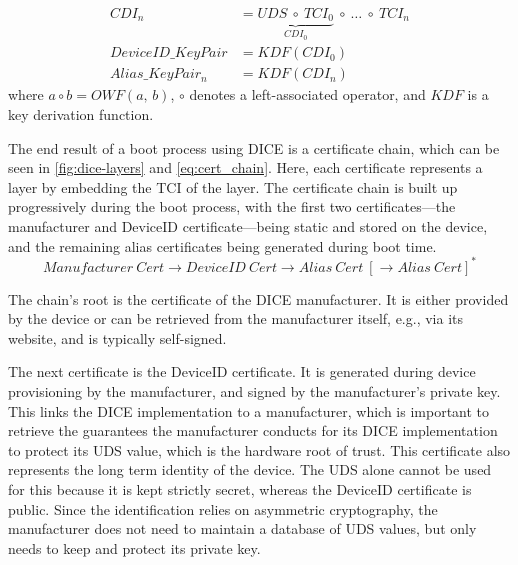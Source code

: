\noindent
\begin{minipage}{\linewidth}
\begin{align}
  \label{eq:dice_cdi}
  CDI_n &= \underbrace{UDS\ \circ\ TCI_0}_{CDI_0}\ \circ\ \ldots\ \circ\ TCI_n\\
  \label{eq:dice_deviceID}
  DeviceID\_KeyPair &= KDF(CDI_0)\\
  \label{eq:dice_alias}
  Alias\_KeyPair_n  &= KDF(CDI_n)
\end{align}
where \(a \circ b = OWF(a,\,b)\), \(\circ\) denotes a left-associated operator, and \(KDF\) is a key derivation function.
\end{minipage}
\baselineskip


The end result of a boot process using \ac{DICE} is a certificate chain, which can be seen in \autoref{fig:dice-layers} and \autoref{eq:cert_chain}.
Here, each certificate represents a layer by embedding the \ac{TCI} of the layer.
The certificate chain is built up progressively during the boot process, with the first two certificates---the manufacturer and DeviceID certificate---being static and stored on the device, and the remaining alias certificates being generated during boot time.
\begin{equation}
  \label{eq:cert_chain}
  Manufacturer\ Cert \rightarrow DeviceID\ Cert \rightarrow Alias\ Cert\ [\rightarrow Alias\ Cert]^*
\end{equation}

The chain's root is the certificate of the DICE manufacturer.
It is either provided by the device or can be retrieved from the manufacturer itself, e.g., via its website, and is typically self-signed.




The next certificate is the DeviceID certificate.
It is generated during device provisioning by the manufacturer, and signed by the manufacturer's private key.
This links the DICE implementation to a manufacturer, which is important to retrieve the guarantees the manufacturer conducts for its DICE implementation to protect its \ac{UDS} value, which is the hardware root of trust.
This certificate also represents the long term identity of the device.
The \ac{UDS} alone cannot be used for this because it is kept strictly secret, whereas the DeviceID certificate is public.
Since the identification relies on asymmetric cryptography, the manufacturer does not need to maintain a database of \ac{UDS} values, but only needs to keep and protect its private key.

